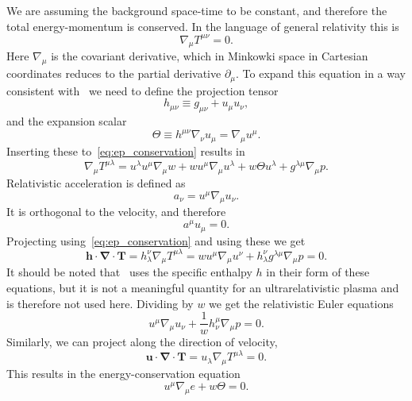 We are assuming the background space-time to be constant, and therefore the total energy-momentum is conserved.
In the language of general relativity this is
\begin{equation}
\nabla_\mu T^{\mu\nu} = 0.
\label{eq:ep_conservation}
\end{equation}
Here $\nabla_\mu$ is the covariant derivative, which in Minkowki space in Cartesian coordinates reduces to the partial derivative $\partial_\mu$.
To expand this equation in a way consistent with~\cite[ch. 3.3]{rezzolla_relativistic_2013} we need to define the projection tensor
\cite[eq. 3.9]{rezzolla_relativistic_2013}
\begin{equation}
h_{\mu\nu} \equiv g_{\mu\nu} + u_\mu u_\nu,
\label{eq:projection_tensor}
\end{equation}
and the expansion scalar
\cite[eq. 3.13]{rezzolla_relativistic_2013}
\begin{equation}
\Theta \equiv h^{\mu\nu} \nabla_\nu u_\mu = \nabla_\mu u^\mu.
\end{equation}
Inserting these to~\eqref{eq:ep_conservation} results in
\begin{equation}
\nabla_\mu T^{\mu \lambda} = u^\lambda u^\mu \nabla_\mu w + w u^\mu \nabla_\mu u^\lambda + w \Theta u^\lambda + g^{\lambda\mu} \nabla_\mu p.
\end{equation}
Relativistic acceleration is defined as
\begin{equation}
a_\nu = u^\mu \nabla_\mu u_\nu.
\end{equation}
It is orthogonal to the velocity, and therefore
\begin{equation}
a^\mu u_\mu = 0.
\end{equation}
Projecting using~\eqref{eq:ep_conservation} and using these we get
\cite[eq. 3.54]{rezzolla_relativistic_2013}
\begin{equation}
\bm{h} \cdot \bm{\nabla} \cdot \bm{T}
= h^\nu_\lambda \nabla_\mu T^{\mu \lambda}
= w u^\mu \nabla_\mu u^\nu + h^\nu_\lambda g^{\lambda\mu} \nabla_\mu p
= 0.
\end{equation}
It should be noted that~\cite{rezzolla_relativistic_2013} uses the specific enthalpy $h$ in their form of these equations,
but it is not a meaningful quantity for an ultrarelativistic plasma and is therefore not used here.
Dividing by $w$ we get the relativistic Euler equations
\cite[eq. 3.55]{rezzolla_relativistic_2013}
\begin{equation}
u^\mu \nabla_\mu u_\nu + \frac{1}{w} h^\mu_\nu \nabla_\mu p = 0.
\end{equation}
Similarly, we can project along the direction of velocity,
\begin{equation}
\bm{u} \cdot \bm{\nabla} \cdot \bm{T} = u_\lambda \nabla_\mu T^{\mu\lambda} = 0.
\end{equation}
This results in the energy-conservation equation
\cite[eq. 3.57]{rezzolla_relativistic_2013}
\begin{equation}
u^\mu \nabla_\mu e + w \Theta = 0.
\end{equation}

